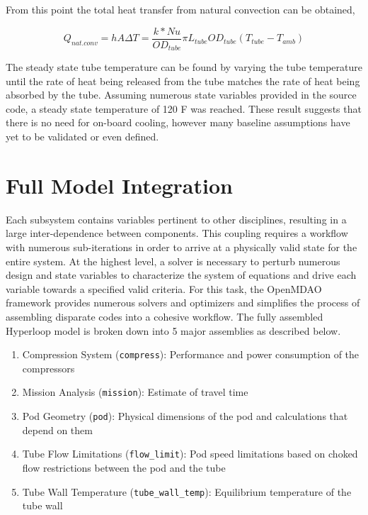 \documentclass[heading.tex]{subfiles}
\begin{document}
From this point the total heat transfer from natural convection can be obtained,

\begin{equation*}
Q_{nat. conv} = hA \Delta T = \frac{k*Nu}{ {OD}_{tube}} \pi {L}_{tube} {OD}_{tube} (T_{tube}-T_{amb})
\end{equation*}

The steady state tube temperature can be found by varying the tube temperature until the rate of heat being released from the tube
matches the rate of heat being absorbed by the tube. Assuming numerous state variables provided in the source code, a steady state temperature of 120 F
was reached. These result suggests that there is no need for on-board cooling, however many baseline assumptions have yet to be validated or even defined.

\section{Full Model Integration}

Each subsystem contains variables pertinent to other disciplines, resulting in a large inter-dependence between components. 
This coupling requires a workflow with numerous sub-iterations in order to arrive at a physically valid state for the entire system.
At the highest level, a solver is necessary to perturb numerous design and state variables to characterize the system of equations and drive each variable
towards a specified valid criteria. For this task, the OpenMDAO framework provides numerous solvers and optimizers and simplifies the process of assembling
disparate codes into a cohesive workflow. The fully assembled Hyperloop model is broken down into 5 major assemblies as described below. 

\begin{enumerate}
  \item Compression System (\texttt{compress}): Performance and power consumption of the compressors
  \item Mission Analysis (\texttt{mission}): Estimate of travel time
  \item Pod Geometry (\texttt{pod}): Physical dimensions of the pod and calculations that depend on them
  \item Tube Flow Limitations (\texttt{flow\_limit}): Pod speed limitations based on choked flow restrictions between the pod and the tube
  \item Tube Wall Temperature (\texttt{tube\_wall\_temp}): Equilibrium temperature of the tube wall
\end{enumerate}
\end{document}

